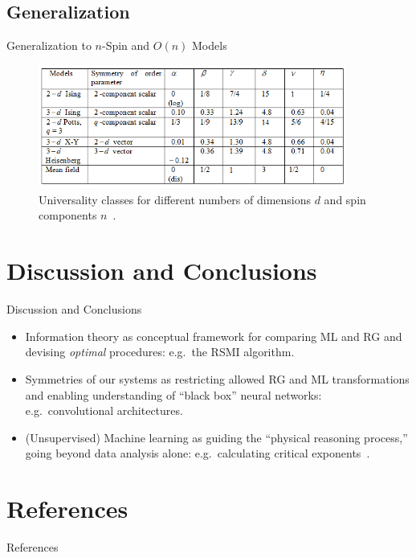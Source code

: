 \documentclass{beamer}
\begin{document}
\subsection{Generalization}
\begin{frame}{Generalization to $n$-Spin and $O(n)$ Models}
  \begin{figure}[ht]
  \centering
  \includegraphics[width=0.9\textwidth]{figures/universality-classes.png}
  \caption{Universality classes for different numbers of dimensions $d$ and spin components $n$~\cite{universality-classes}.}
\end{figure}
\end{frame}

\section{Discussion and Conclusions}
\begin{frame}{Discussion and Conclusions}
  \begin{itemize}
  \item Information theory as conceptual framework for comparing ML
    and RG and devising \textit{optimal} procedures: e.g.\ the RSMI
    algorithm.
  \item Symmetries of our systems as restricting allowed RG and ML
    transformations and enabling understanding of ``black box'' neural
    networks: e.g.\ convolutional architectures.
  \item (Unsupervised) Machine learning as guiding the ``physical reasoning
    process,'' going beyond data analysis alone: e.g.\ calculating
    critical exponents~\cite{kjr}.
  \end{itemize}
\end{frame}


\section{References}
\begin{frame}{References}
  {\tiny

     
    }
\end{frame}
\end{document}
